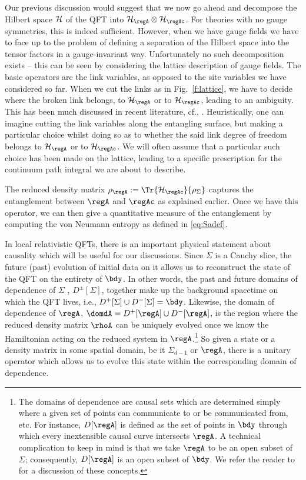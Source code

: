 \documentclass[12pt,openany]{book}
\begin{document}
Our previous discussion would suggest that we now go ahead and decompose the Hilbert space ${\cal H}$ of the QFT into ${\cal H}_{\regA} \otimes {\cal H}_{\regAc}$. For theories with no gauge symmetries, this is indeed sufficient. However, when we have gauge fields we have to face up to the problem of defining a separation of the Hilbert space into the tensor factors in a gauge-invariant way. Unfortunately no such decomposition exists -- this can be seen by considering the lattice description of gauge fields. The basic operators are
the link variables, as opposed to the site variables we have considered so far.
When we cut the links as in Fig.~\ref{f:lattice}, we have to decide where the broken link belongs, to ${\cal H}_\regA$ or to ${\cal H}_{\regAc}$, leading to an ambiguity. This has been much discussed in recent literature, cf., \cite{Buividovich:2008gq,Donnelly:2011hn,Casini:2013rba,Donnelly:2014gva}. Heuristically, one can imagine cutting the link variables along the entangling surface, but making a particular choice whilst doing so as to whether the said link degree of freedom belongs to ${\cal H}_\regA$ or to ${\cal H}_{\regAc}$. We will often assume that a particular such choice has been made on the lattice, leading to a specific prescription for the continuum path integral we are about to describe.

The reduced density matrix $\rho_{\regA} := \Tr{{\cal H}_{\regAc}}{\rho_\Sigma}$ captures the entanglement between $\regA$ and $\regAc$  as explained earlier. Once we have this operator, we can then give a quantitative measure of the entanglement by computing the von Neumann entropy as defined in \eqref{eq:Sadef}.

In local relativistic QFTs, there is an important physical statement about causality which will be  useful for our discussions. Since $\Sigma$ is a Cauchy slice, the future (past) evolution of initial data on it allows us to reconstruct the state of the QFT on the entirety of $\bdy$. In other words, the past and future domains of dependence of $\Sigma$ , $D^\pm[\Sigma]$, together make up the background spacetime on which the QFT lives, i.e.,
$D^+[\Sigma] \cup D^-[\Sigma] = \bdy$.  Likewise,  the domain of dependence of $\regA$,  $\domdA = D^+[\regA] \cup D^-[\regA]$,  is the region where the reduced density matrix $\rhoA$ can be uniquely evolved once we know the Hamiltonian acting on the reduced system in $\regA$.\footnote{ The domains of dependence are causal sets which are determined simply where a given set of points can communicate to or be communicated from, etc. For instance, $D[\regA]$ is defined as the set of points in $\bdy$ through which every inextensible causal curve intersects $\regA$.
A technical complication to keep in mind is that we take $\regA$ to be an open subset of $\Sigma$; consequently, $D[\regA]$ is an open subset of $\bdy$.
We refer the reader to \cite{Wald:1984ai} for a discussion of these concepts.
} So given a state or a density matrix in some spatial domain, be it $\Sigma_{d-1}$ or
$\regA$, there is a unitary operator which allows us to evolve this state within the corresponding domain of dependence.
\end{document}
